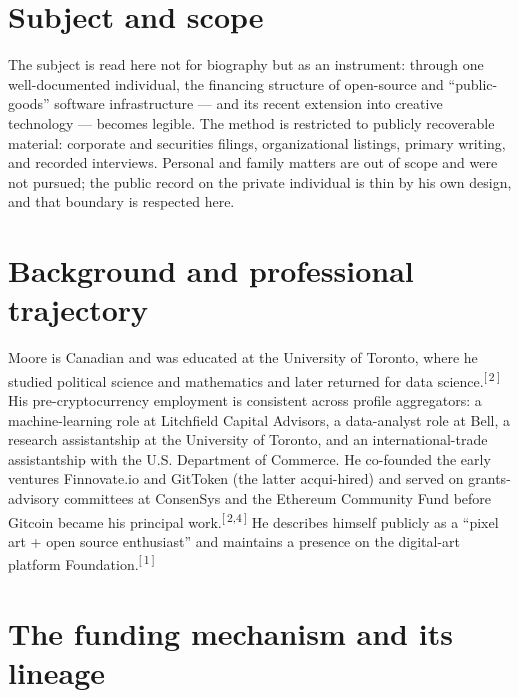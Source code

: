 \documentclass[11pt,letterpaper]{article}
\newcommand{\refn}[1]{\textsuperscript{[\,#1\,]}}
\begin{document}
\section{Subject and scope}

The subject is read here not for biography but as an instrument: through one
well-documented individual, the financing structure of open-source and
``public-goods'' software infrastructure --- and its recent extension into
creative technology --- becomes legible. The method is restricted to publicly
recoverable material: corporate and securities filings, organizational
listings, primary writing, and recorded interviews. Personal and family
matters are out of scope and were not pursued; the public record on the
private individual is thin by his own design, and that boundary is respected
here.

\section{Background and professional trajectory}

Moore is Canadian and was educated at the University of Toronto, where he
studied political science and mathematics and later returned for data
science.\refn{2} His pre-cryptocurrency employment is consistent across
profile aggregators: a machine-learning role at Litchfield Capital Advisors, a
data-analyst role at Bell, a research assistantship at the University of
Toronto, and an international-trade assistantship with the U.S. Department of
Commerce. He co-founded the early ventures Finnovate.io and GitToken (the
latter acqui-hired) and served on grants-advisory committees at ConsenSys and
the Ethereum Community Fund before Gitcoin became his principal
work.\refn{2,4} He describes himself publicly as a ``pixel art + open source
enthusiast'' and maintains a presence on the digital-art platform
Foundation.\refn{1}

\section{The funding mechanism and its lineage}
\end{document}
